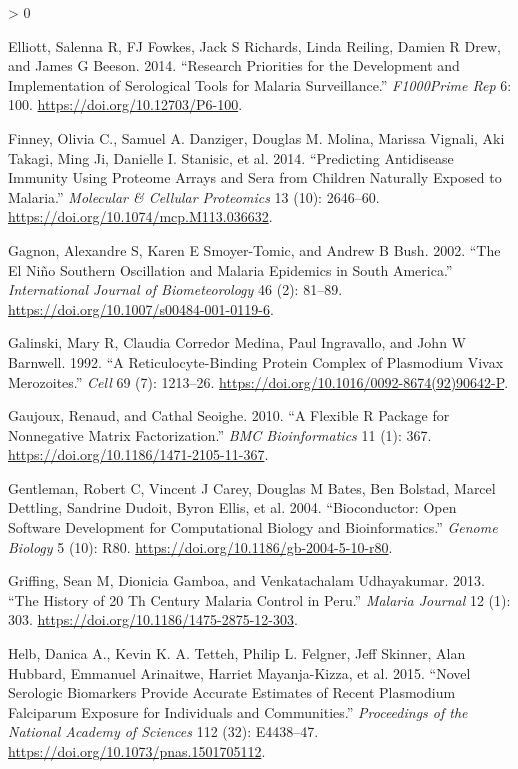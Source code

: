 \documentclass[
  a4paper]{article}
\newlength{\cslhangindent}
\newenvironment{CSLReferences}[2] %
 {%
  \setlength{\parindent}{0pt}
  \ifodd #1 \everypar{\setlength{\hangindent}{\cslhangindent}}\ignorespaces\fi
  \ifnum #2 > 0
  \setlength{\parskip}{#2\baselineskip}
  \fi
 }%
 {}
\begin{document}
\begin{CSLReferences}{1}{0}
\leavevmode\hypertarget{ref-elliott2014}{}%
Elliott, Salenna R, FJ Fowkes, Jack S Richards, Linda Reiling, Damien R
Drew, and James G Beeson. 2014. {``Research Priorities for the
Development and Implementation of Serological Tools for Malaria
Surveillance.''} \emph{F1000Prime Rep} 6: 100.
\url{https://doi.org/10.12703/P6-100}.

\leavevmode\hypertarget{ref-Finney2014}{}%
Finney, Olivia C., Samuel A. Danziger, Douglas M. Molina, Marissa
Vignali, Aki Takagi, Ming Ji, Danielle I. Stanisic, et al. 2014.
{``Predicting Antidisease Immunity Using Proteome Arrays and Sera from
Children Naturally Exposed to Malaria.''} \emph{Molecular \& Cellular
Proteomics} 13 (10): 2646--60.
\url{https://doi.org/10.1074/mcp.M113.036632}.

\leavevmode\hypertarget{ref-gagnon2002enso}{}%
Gagnon, Alexandre S, Karen E Smoyer-Tomic, and Andrew B Bush. 2002.
{``The {El Ni{ñ}o} Southern Oscillation and Malaria Epidemics in {South
America}.''} \emph{International Journal of Biometeorology} 46 (2):
81--89. \url{https://doi.org/10.1007/s00484-001-0119-6}.

\leavevmode\hypertarget{ref-galinski1992rbp}{}%
Galinski, Mary R, Claudia Corredor Medina, Paul Ingravallo, and John W
Barnwell. 1992. {``A Reticulocyte-Binding Protein Complex of Plasmodium
Vivax Merozoites.''} \emph{Cell} 69 (7): 1213--26.
\url{https://doi.org/10.1016/0092-8674(92)90642-P}.

\leavevmode\hypertarget{ref-Gaujoux2010NMF}{}%
Gaujoux, Renaud, and Cathal Seoighe. 2010. {``A Flexible {R} Package for
Nonnegative Matrix Factorization.''} \emph{{BMC} Bioinformatics} 11 (1):
367. \url{https://doi.org/10.1186/1471-2105-11-367}.

\leavevmode\hypertarget{ref-bioconductor2004}{}%
Gentleman, Robert C, Vincent J Carey, Douglas M Bates, Ben Bolstad,
Marcel Dettling, Sandrine Dudoit, Byron Ellis, et al. 2004.
{``Bioconductor: Open Software Development for Computational Biology and
Bioinformatics.''} \emph{Genome Biology} 5 (10): R80.
\url{https://doi.org/10.1186/gb-2004-5-10-r80}.

\leavevmode\hypertarget{ref-griffing2013history}{}%
Griffing, Sean M, Dionicia Gamboa, and Venkatachalam Udhayakumar. 2013.
{``The History of 20 Th Century Malaria Control in {Peru}.''}
\emph{Malaria Journal} 12 (1): 303.
\url{https://doi.org/10.1186/1475-2875-12-303}.

\leavevmode\hypertarget{ref-Helb2015exposure}{}%
Helb, Danica A., Kevin K. A. Tetteh, Philip L. Felgner, Jeff Skinner,
Alan Hubbard, Emmanuel Arinaitwe, Harriet Mayanja-Kizza, et al. 2015.
{``Novel Serologic Biomarkers Provide Accurate Estimates of Recent
Plasmodium Falciparum Exposure for Individuals and Communities.''}
\emph{Proceedings of the National Academy of Sciences} 112 (32):
E4438--47. \url{https://doi.org/10.1073/pnas.1501705112}.


\end{CSLReferences}
\end{document}
